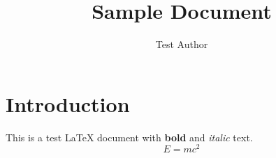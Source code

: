 \documentclass{article}
\title{Sample Document}
\author{Test Author}
\begin{document}
\maketitle
\section{Introduction}
This is a test LaTeX document with \textbf{bold} and \textit{italic} text.
\begin{equation}
E = mc^2
\end{equation}
\end{document}
